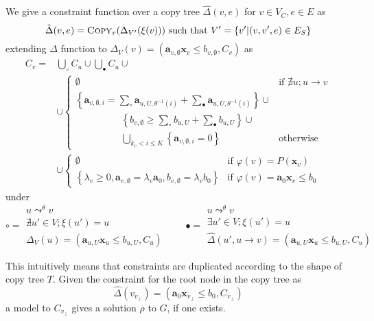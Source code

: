 \documentclass[a4paper,12pt]{article}
\begin{document}
We give a constraint function over a copy tree
$\hat \Delta(v,e)$ for $v \in V_C, e \in E$ as
\[ \hat \Delta (v,e) = \textsc{Copy}_v (\Delta_{V'} (\xi (v)))
\text{ such that } V' = \left\lbrace v' \middle| (v, v',e) \in E_S \right\rbrace \]
extending $\Delta$ function to
$\Delta_V (v) = (\mathbf{a}_{v,\emptyset} \mathbf{x}_v \leq b_{v,\emptyset}, C_v)$
as
\begin{align*}
C_v = & \bigcup_\circ C_u \cup \bigcup_\bullet C_u \cup
\\
& \cup \begin{cases}
\emptyset
& \mbox{if } \nexists u; u \rightarrow v \\
\left\lbrace
 \mathbf{a}_{v,\emptyset,i} =
  \sum_\circ \mathbf{a}_{u,U,\theta^{-1}(i)} +
  \sum_\bullet \mathbf{a}_{u,U, \theta^{-1}(i)}
\right\rbrace \cup \\
\hspace{2cm} \left\lbrace
 b_{v,\emptyset} \geq
  \sum_\circ b_{u,U} +
  \sum_\bullet b_{u,U}
\right\rbrace \cup \\
\hspace{2cm} \bigcup_{k_v < i \leq K} \left\lbrace \mathbf{a}_{v,\emptyset,i} = 0 \right\rbrace
& \mbox{otherwise}
\end{cases}
\\
& \cup \begin{cases}
\emptyset
& \mbox{if } \varphi(v) = P(\mathbf{x}_v) \\
\left\lbrace
 \lambda_v \geq 0, \mathbf{a}_{v,\emptyset} = \lambda_v \mathbf{a}_0,
 b_{v,\emptyset} = \lambda_v b_0
\right\rbrace
& \mbox{if } \varphi(v) = \mathbf{a}_0 \mathbf{x}_v \leq b_0
\end{cases}
\end{align*}
under
\[
\circ = \substack{
  u \mathop{\leadsto}^\theta v \\
  \nexists u' \in V; \xi (u') = u \\
  \Delta_V (u) = (\mathbf{a}_{u,U} \mathbf{x}_u \leq b_{u,U}, C_u)}
\qquad \bullet = \substack{
  u \mathop{\leadsto}^\theta v \\
  \exists u' \in V; \xi (u') = u \\
  \hat \Delta (u', u \rightarrow v) = (\mathbf{a}_{u,U} \mathbf{x}_u \leq b_{u,U}, C_u)} \]

This intuitively means that constraints are duplicated according to
the shape of copy tree $T$.
Given the constraint for the root node in the copy tree as
\[ \hat \Delta (v_{v_\bot}) = (\mathbf{a}_0 \mathbf{x}_{v_\bot} \leq b_0, C_{v_\bot}) \]
a model to $C_{v_\bot}$ gives a solution $\rho$ to $G$, if one exists.
\end{document}
